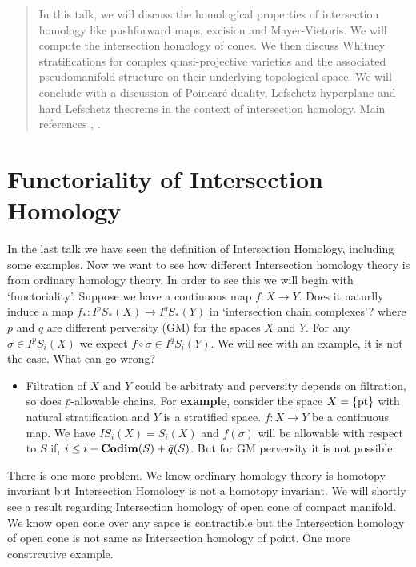 \documentclass[11pt]{article}
\author{ \textsc{Trishan Mondal} \\[0.15cm]
  \href{https://www.isibang.ac.in}{Indian Statistical Institute, Bangalore}}
\date{}
\begin{document}
\maketitle 

\begin{abstract}
    \noindent In this talk, we will discuss the homological properties of intersection homology like pushforward maps, excision and Mayer-Vietoris. We will compute the intersection homology of cones. We then discuss Whitney stratifications for complex quasi-projective varieties and the associated pseudomanifold structure on their underlying topological space. We will conclude with a discussion of Poincaré duality, Lefschetz hyperplane and hard Lefschetz theorems in the context of intersection homology. Main references \cite{maxim2019intersection}, \cite{kirwan2006introduction}.
\end{abstract}

\section{Functoriality of Intersection Homology}

\noindent In the last talk we have seen the definition of Intersection Homology, including some examples. Now we want to see how different Intersection homology theory is from ordinary homology theory. In order to see this we will begin with `functoriality'. Suppose we have a continuous map $f:X\to Y$. Does it naturlly induce a map $f_{\ast} : I^{p}S_{\ast}(X)\to I^{q}S_{\ast}(Y)$ in `intersection chain complexes'? where $p$ and $q$ are different perversity (GM) for the spaces $X$ and $Y$. For any $\sigma \in I^pS_{i}(X)$ we expect $f \circ \sigma \in I^qS_i(Y)$. We will see with an example, it is not the case. What can go wrong? 

\begin{itemize}
    \item[] Filtration of $X$ and $Y$ could be arbitraty and perversity depends on filtration, so does $\bar{p}$-allowable chains. For \textbf{example}, consider the space $X = \qty{\text{pt}}$ with natural stratification and $Y$ is a stratified space. $f:X \to Y$ be a continuous map. We have $IS_i(X)=S_i(X)$ and $f(\sigma)$ will be allowable with respect to $S$ if, $i \leq i -\mathbf{Codim} (S) + \bar{q}(S)$. But for GM perversity it is not possible. 
\end{itemize}

\noindent There is one more problem. We know ordinary homology theory is homotopy invariant but Intersection Homology is not a homotopy invariant. We will shortly see a result regarding Intersection homology of open cone of compact manifold. We know open cone over any sapce is contractible  but the Intersection homology of open cone is not same as Intersection homology of point. One more constrcutive example. 
\end{document}
